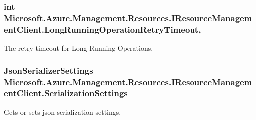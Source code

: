 \subsubsection[{\texorpdfstring{Long\+Running\+Operation\+Retry\+Timeout}{LongRunningOperationRetryTimeout}}]{\setlength{\rightskip}{0pt plus 5cm}int Microsoft.\+Azure.\+Management.\+Resources.\+I\+Resource\+Management\+Client.\+Long\+Running\+Operation\+Retry\+Timeout\hspace{0.3cm}{\ttfamily [get]}, {\ttfamily [set]}}\hypertarget{interface_microsoft_1_1_azure_1_1_management_1_1_resources_1_1_i_resource_management_client_ad843dd318d88f4e31058ce9f0c7891a5}{}\label{interface_microsoft_1_1_azure_1_1_management_1_1_resources_1_1_i_resource_management_client_ad843dd318d88f4e31058ce9f0c7891a5}


The retry timeout for Long Running Operations. 

\subsubsection[{\texorpdfstring{Serialization\+Settings}{SerializationSettings}}]{\setlength{\rightskip}{0pt plus 5cm}Json\+Serializer\+Settings Microsoft.\+Azure.\+Management.\+Resources.\+I\+Resource\+Management\+Client.\+Serialization\+Settings\hspace{0.3cm}{\ttfamily [get]}}\hypertarget{interface_microsoft_1_1_azure_1_1_management_1_1_resources_1_1_i_resource_management_client_a7b8af6324e83c3bce910e351f6757de0}{}\label{interface_microsoft_1_1_azure_1_1_management_1_1_resources_1_1_i_resource_management_client_a7b8af6324e83c3bce910e351f6757de0}


Gets or sets json serialization settings. 

